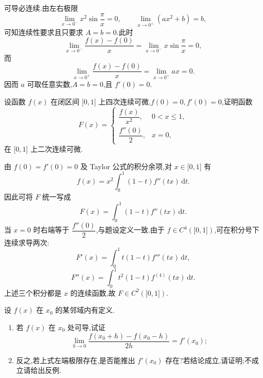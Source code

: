 \begin{solution}
    可导必连续.由左右极限
    \[
        \lim\limits_{x\to0^-}x^2\sin\dfrac{\pi}{x}=0,
        \qquad
        \lim\limits_{x\to0^+}(ax^2+b)=b,
    \]
    可知连续性要求且只要求 $A=b=0$.此时
    \[
        \lim\limits_{x\to0^-}\dfrac{f(x)-f(0)}{x}
        =\lim\limits_{x\to0^-}x\sin\dfrac{\pi}{x}=0,
    \]
    而
    \[
        \lim\limits_{x\to0^+}\dfrac{f(x)-f(0)}{x}
        =\lim\limits_{x\to0^+}ax=0.
    \]
    因而 $a$ 可取任意实数,$A=b=0$,且 $f'(0)=0$.
\end{solution}

\begin{example}
    设函数 $f(x)$ 在闭区间 $\lbrack 0,1\rbrack$ 上四次连续可微,$f(0)=0,f'(0)=0$,证明函数
    \[
        F(x)=
        \begin{cases}
            \dfrac{f(x)}{x^2}, & 0<x\leq1, \\
            \dfrac{f''(0)}{2}, & x=0,
        \end{cases}
    \]
    在 $\lbrack 0,1\rbrack$ 上二次连续可微.
\end{example}
\exampleblank

\begin{solution}
    由 $f(0)=f'(0)=0$ 及 Taylor 公式的积分余项,对 $x\in\lbrack0,1\rbrack$ 有
    \[
        f(x)=x^2\int_0^1(1-t)f''(tx)\,\mathrm{d}t.
    \]
    因此可将 $F$ 统一写成
    \[
        F(x)=\int_0^1(1-t)f''(tx)\,\mathrm{d}t.
    \]
    当 $x=0$ 时右端等于 $\dfrac{f''(0)}{2}$,与题设定义一致.由于 $f\in C^4(\lbrack0,1\rbrack)$,可在积分号下连续求导两次:
    \[
        F'(x)=\int_0^1t(1-t)f'''(tx)\,\mathrm{d}t,
    \]
    \[
        F''(x)=\int_0^1t^2(1-t)f^{(4)}(tx)\,\mathrm{d}t.
    \]
    上述三个积分都是 $x$ 的连续函数,故 $F\in C^2(\lbrack0,1\rbrack)$.
\end{solution}

\begin{example}
    设 $f(x)$ 在 $x_0$ 的某邻域内有定义.
    \begin{enumerate}
        \item 若 $f(x)$ 在 $x_0$ 处可导,试证
              \[
                  \lim\limits_{h\to0}
                  \dfrac{f(x_0+h)-f(x_0-h)}{2h}=f'(x_0);
              \]
        \item 反之,若上式左端极限存在,是否能推出 $f'(x_0)$ 存在?若结论成立,请证明;不成立请给出反例.
    \end{enumerate}
\end{example}
\exampleblank

